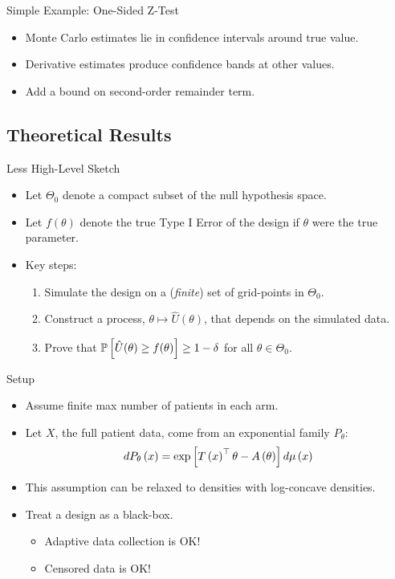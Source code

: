 \begin{frame}{Simple Example: One-Sided Z-Test}
\begin{figure}
\begin{subfigure}[b]{0.49\textwidth}
\end{subfigure}
\end{figure}
\begin{itemize}
    \item Monte Carlo estimates lie in confidence intervals around true value.
    \item Derivative estimates produce confidence bands at other values.
    \item Add a bound on second-order remainder term. 
\end{itemize}
\end{frame}

\subsection{Theoretical Results}

\begin{frame}{Less High-Level Sketch}
\begin{itemize}
\item Let $\Theta_0$ denote a compact subset of the null
    hypothesis space.
\item Let $f(\theta)$ denote the true Type I Error of the design
    if $\theta$ were the true parameter.
\item Key steps: 
\begin{enumerate}
    \item Simulate the design on a (\emph{finite}) set of grid-points
        in $\Theta_0$.
    \item Construct a process, $\theta \mapsto \hat{U}(\theta)$, 
    that depends on the simulated data.
    \item Prove that $\mathbb{P}\left[\hat{U}(\theta) \geq f(\theta)\right] \geq 1-\delta$ for all $\theta \in \Theta_0$.
\end{enumerate}
\end{itemize}
\end{frame}

\begin{frame}{Setup}
\begin{itemize}
    \item Assume finite max number of patients in each arm.
    \item Let $X$, the full patient data, come from an exponential family $P_{\theta}$:
    \begin{align*}
        dP_\theta\left( x \right) = \exp\left[T\left( x \right)^\top \theta - A\left( \theta \right)\right] d\mu\left( x \right)
    \end{align*}
    \item This assumption can be relaxed to densities with log-concave densities.
    \item Treat a design as a black-box.
    \begin{itemize}
        \item Adaptive data collection is OK!\@
        \item Censored data is OK!\@
    \end{itemize}
\end{itemize}
\end{frame}


